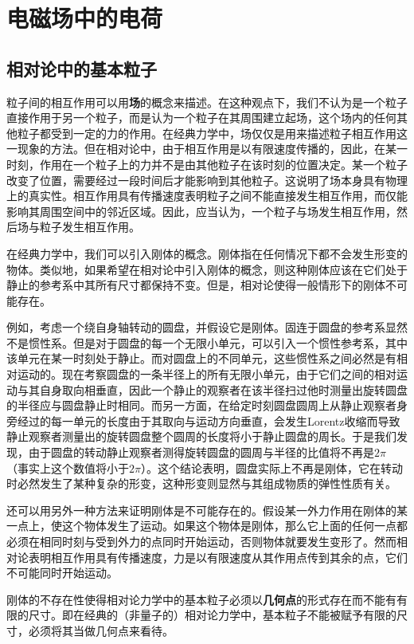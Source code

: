 \chapter{电磁场中的电荷}

\section{相对论中的基本粒子}

粒子间的相互作用可以用{\bf 场}的概念来描述。在这种观点下，我们不认为是一个粒子直接作用于另一个粒子，而是认为一个粒子在其周围建立起场，这个场内的任何其他粒子都受到一定的力的作用。在经典力学中，场仅仅是用来描述粒子相互作用这一现象的方法。但在相对论中，由于相互作用是以有限速度传播的，因此，在某一时刻，作用在一个粒子上的力并不是由其他粒子在该时刻的位置决定。某一个粒子改变了位置，需要经过一段时间后才能影响到其他粒子。这说明了场本身具有物理上的真实性。相互作用具有传播速度表明粒子之间不能直接发生相互作用，而仅能影响其周围空间中的邻近区域。因此，应当认为，一个粒子与场发生相互作用，然后场与粒子发生相互作用。

在经典力学中，我们可以引入刚体的概念。刚体指在任何情况下都不会发生形变的物体。类似地，如果希望在相对论中引入刚体的概念，则这种刚体应该在它们处于静止的参考系中其所有尺寸都保持不变。但是，相对论使得一般情形下的刚体不可能存在。

例如，考虑一个绕自身轴转动的圆盘，并假设它是刚体。固连于圆盘的参考系显然不是惯性系。但是对于圆盘的每一个无限小单元，可以引入一个惯性参考系，其中该单元在某一时刻处于静止。而对圆盘上的不同单元，这些惯性系之间必然是有相对运动的。现在考察圆盘的一条半径上的所有无限小单元，由于它们之间的相对运动与其自身取向相垂直，因此一个静止的观察者在该半径扫过他时测量出旋转圆盘的半径应与圆盘静止时相同。而另一方面，在给定时刻圆盘圆周上从静止观察者身旁经过的每一单元的长度由于其取向与运动方向垂直，会发生Lorentz收缩而导致静止观察者测量出的旋转圆盘整个圆周的长度将小于静止圆盘的周长。于是我们发现，由于圆盘的转动静止观察者测得旋转圆盘的圆周与半径的比值将不再是$2\pi$（事实上这个数值将小于$2\pi$）。这个结论表明，圆盘实际上不再是刚体，它在转动时必然发生了某种复杂的形变，这种形变则显然与其组成物质的弹性性质有关。

还可以用另外一种方法来证明刚体是不可能存在的。假设某一外力作用在刚体的某一点上，使这个物体发生了运动。如果这个物体是刚体，那么它上面的任何一点都必须在相同时刻与受到外力的点同时开始运动，否则物体就要发生变形了。然而相对论表明相互作用具有传播速度，力是以有限速度从其作用点传到其余的点，它们不可能同时开始运动。

刚体的不存在性使得相对论力学中的基本粒子必须以{\bf 几何点}的形式存在而不能有有限的尺寸。即在经典的（非量子的）相对论力学中，基本粒子不能被赋予有限的尺寸，必须将其当做几何点来看待。

